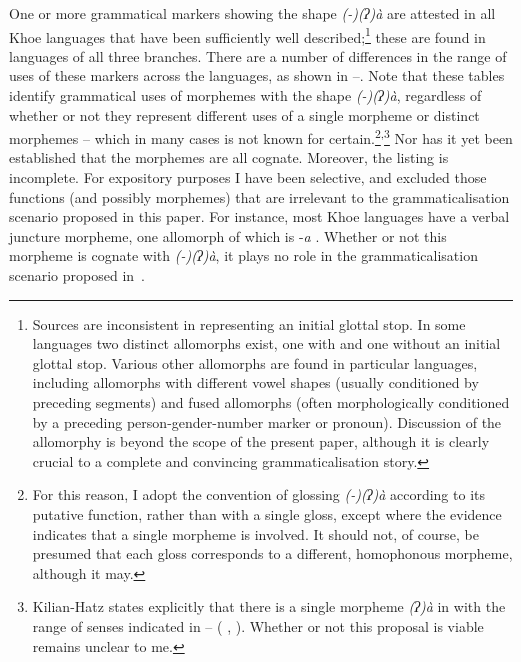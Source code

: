 \documentclass[output=paper]{LSP/langsci}
\begin{document}
One or more grammatical markers showing the shape \textit{(-)(ʔ)à} are attested in all Khoe languages that have been sufficiently well described;\footnote{Sources are inconsistent in representing an initial glottal stop. In some languages two distinct allomorphs exist, one with and one without an initial glottal stop. Various other allomorphs are found in particular languages, including allomorphs with different vowel shapes (usually conditioned by preceding segments) and fused allomorphs (often morphologically conditioned by a preceding person-gender-number marker or pronoun). Discussion of the allomorphy is beyond the scope of the present paper, although it is clearly crucial to a complete and convincing grammaticalisation story.} these are found in languages of all three branches. There are a number of differences in the range of uses of these markers across the languages, as shown in –.  Note that these tables identify grammatical uses of morphemes with the shape \textit{(-)(ʔ)à}, regardless of whether or not they represent different uses of a single morpheme or distinct morphemes – which in many cases is not known for certain.\footnote{For this reason, I adopt the convention of glossing \textit{(-)(ʔ)à} according to its putative function, rather than with a single gloss, except where the evidence indicates that a single morpheme is involved. It should not, of course, be presumed that each gloss corresponds to a different, homophonous morpheme, although it may.}\textsuperscript{,}\footnote{Kilian-Hatz states explicitly that there is a single morpheme \textit{(ʔ)à} in  with the range of senses indicated in – (\citeauthor{Kilian-Hatz2008Grammar}  \citeyear[52–53]{Kilian-Hatz2008Grammar}, \citeyear[368]{Kilian-Hatz2013Kxoe}). Whether or not this proposal is viable remains unclear to me.} Nor has it yet been established that the morphemes are all cognate. Moreover, the listing is incomplete. For expository purposes I have been selective, and excluded those functions (and possibly morphemes) that are irrelevant to the grammaticalisation scenario proposed in this paper. For instance, most Khoe languages have a verbal juncture morpheme, one allomorph of which is -\textit{a} \citep{Vossen2010Verbal}. Whether or not this morpheme is cognate with \textit{(-)(ʔ)à}, it plays no role in the grammaticalisation scenario proposed in~.
\end{document}
